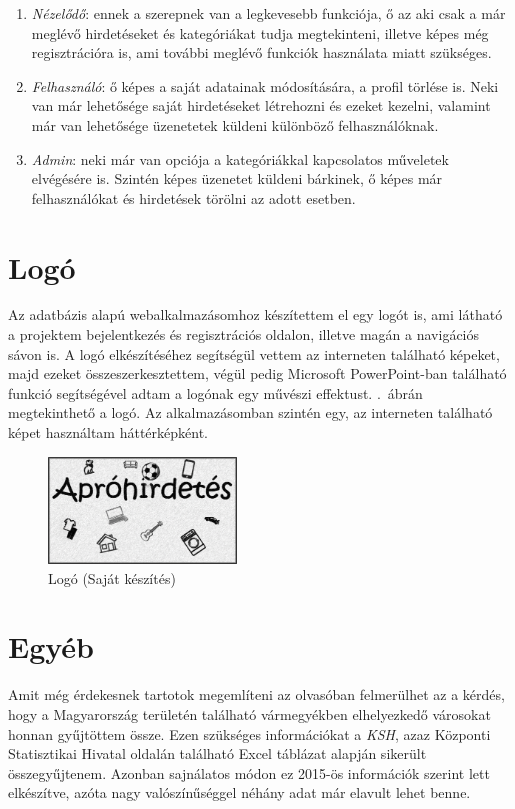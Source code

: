 \documentclass[]{thesis-ekf}
\theoremstyle{definition}
\theoremstyle{remark}
\begin{document}
	\begin{enumerate}
		\item \emph{Nézelődő}: ennek a szerepnek van a legkevesebb funkciója, ő az aki csak a már meglévő hirdetéseket és kategóriákat tudja megtekinteni, illetve képes még regisztrációra is, ami további meglévő funkciók használata miatt szükséges.
		\item \emph{Felhasználó}: ő képes a saját adatainak módosítására, a profil törlése is. Neki van már lehetősége saját hirdetéseket létrehozni és ezeket kezelni, valamint már van lehetősége üzenetetek küldeni különböző felhasználóknak.
		\item \emph{Admin}: neki már van opciója a kategóriákkal kapcsolatos műveletek elvégésére is. Szintén képes üzenetet küldeni bárkinek, ő képes már felhasználókat és hirdetések törölni az adott esetben.
	\end{enumerate}
	\section{Logó}
		Az adatbázis alapú webalkalmazásomhoz készítettem el egy logót is, ami látható a projektem bejelentkezés és regisztrációs oldalon, illetve magán a navigációs sávon is. A logó elkészítéséhez segítségül vettem az interneten található képeket, majd ezeket összeszerkesztettem, végül pedig Microsoft PowerPoint-ban található funkció segítségével adtam a logónak egy művészi effektust. .~ábrán megtekinthető a logó. Az alkalmazásomban szintén egy, az interneten található képet használtam háttérképként. \cite{Hatterkep, Logo}
		\begin{figure}[ht!]
			\centering
			\includegraphics[width=5cm]{./tervezes/logo}
			\caption{Logó (Saját készítés)} 
			\label{logo}
		\end{figure}
	
	\section{Egyéb}
		Amit még érdekesnek tartotok megemlíteni az olvasóban felmerülhet az a kérdés, hogy a Magyarország területén található vármegyékben elhelyezkedő városokat honnan gyűjtöttem össze. Ezen szükséges információkat a \emph{KSH}, azaz Központi Statisztikai Hivatal oldalán található Excel táblázat alapján sikerült összegyűjtenem. Azonban sajnálatos módon ez 2015-ös információk szerint lett elkészítve, azóta nagy valószínűséggel néhány adat már elavult lehet benne. \cite{KSH}
\end{document}
